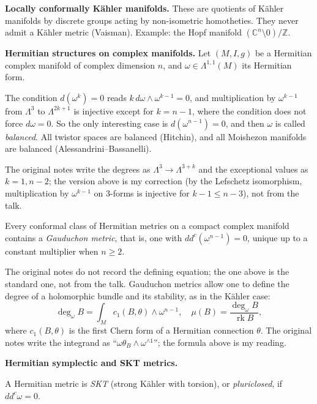 \medskip\noindent
{\bf Locally conformally Kähler manifolds.}
These are quotients of Kähler manifolds by
discrete groups acting by non-isometric
homotheties. They never admit a Kähler
metric (Vaisman). Example: the Hopf manifold
$(\mathbb{C}^n\setminus 0)/\mathbb{Z}$.

\medskip\noindent
{\bf Hermitian structures on complex
manifolds.} Let $(M,I,g)$ be a Hermitian
complex manifold of complex dimension $n$,
and $\omega\in\Lambda^{1,1}(M)$ its
Hermitian form.

\begin{remark}
\label{remark-verbitsky-balanced}
The condition $d(\omega^k)=0$ reads
$k\,d\omega\wedge\omega^{k-1}=0$, and
multiplication by $\omega^{k-1}$ from
$\Lambda^3$ to $\Lambda^{2k+1}$ is injective
except for $k=n-1$, where the condition
does not force $d\omega=0$. So the only
interesting case is $d(\omega^{n-1})=0$,
and then $\omega$ is called
\emph{balanced}. All twistor spaces are
balanced (Hitchin), and all Moishezon
manifolds are balanced
(Alessandrini--Bassanelli).
\end{remark}

The original notes write the degrees as
$\Lambda^3\to\Lambda^{3+k}$ and the
exceptional values as $k=1,n-2$; the
version above is my correction (by the
Lefschetz isomorphism, multiplication by
$\omega^{k-1}$ on $3$-forms is injective for
$k-1\leq n-3$), not from the talk.

\begin{theorem}[Gauduchon]
\label{theorem-verbitsky-gauduchon}
Every conformal class of Hermitian metrics
on a compact complex manifold contains a
\emph{Gauduchon metric}, that is, one with
$dd^c(\omega^{n-1})=0$, unique up to a
constant multiplier when $n\geq 2$.
\end{theorem}

The original notes do not record the
defining equation; the one above is the
standard one, not from the talk. Gauduchon
metrics allow one to define the degree of a
holomorphic bundle and its stability, as in
the Kähler case:
$$
\deg_\omega B=
\int_M c_1(B,\theta)\wedge\omega^{n-1},
\quad
\mu(B)=\frac{\deg_\omega B}
{\operatorname{rk}B},
$$
where $c_1(B,\theta)$ is the first Chern
form of a Hermitian connection $\theta$. The
original notes write the integrand as
``$\omega\theta_B\wedge\omega^{\wedge 1}$'';
the formula above is my reading.

\medskip\noindent
{\bf Hermitian symplectic and SKT metrics.}

\begin{definition}
\label{definition-verbitsky-skt}
A Hermitian metric is \emph{SKT} (strong
Kähler with torsion), or
\emph{pluriclosed}, if $dd^c\omega=0$.
\end{definition}

